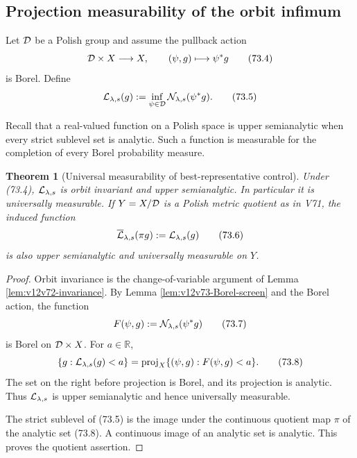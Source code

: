 \documentclass[11pt]{article}
\newtheorem{theorem}{Theorem}[section]
\theoremstyle{remark}
\begin{document}
\subsection{Projection measurability of the orbit infimum}

Let \({\cal D}\) be a Polish group and assume the pullback action
\[
                         {\cal D}\times X\longrightarrow X,
 \qquad(\psi,g)\longmapsto\psi^*g                            \tag{73.4}
\]
is Borel.  Define
\begin{equation}
 {\cal L}_{\lambda,s}(g)
 :=\inf_{\psi\in{\cal D}}
 {\cal N}_{\lambda,s}(\psi^*g).                              \tag{73.5}
\end{equation}

Recall that a real-valued function on a Polish space is upper
semianalytic when every strict sublevel set is analytic.  Such a
function is measurable for the completion of every Borel
probability measure.

\begin{theorem}[Universal measurability of best-representative
control]
\label{thm:v12v73-universal}
Under (73.4), \({\cal L}_{\lambda,s}\) is orbit invariant and upper
semianalytic.  In particular it is universally measurable.  If
\(Y=X/{\cal D}\) is a Polish metric quotient as in V71, the induced
function
\[
 \overline{\cal L}_{\lambda,s}(\pi g)
 :={\cal L}_{\lambda,s}(g)                                  \tag{73.6}
\]
is also upper semianalytic and universally measurable on \(Y\).
\end{theorem}

\begin{proof}
Orbit invariance is the change-of-variable argument of Lemma
\ref{lem:v12v72-invariance}.  By Lemma
\ref{lem:v12v73-Borel-screen} and the Borel action, the function
\[
 F(\psi,g):={\cal N}_{\lambda,s}(\psi^*g)                    \tag{73.7}
\]
is Borel on \({\cal D}\times X\).  For \(a\in\mathbb R\),
\begin{equation}
 \{g:{\cal L}_{\lambda,s}(g)<a\}
 =
 \operatorname{proj}_X\{(\psi,g):F(\psi,g)<a\}.              \tag{73.8}
\end{equation}
The set on the right before projection is Borel, and its projection
is analytic.  Thus \({\cal L}_{\lambda,s}\) is upper semianalytic
and hence universally measurable.

The strict sublevel of (73.5) is the image under the continuous
quotient map \(\pi\) of the analytic set (73.8).  A continuous image
of an analytic set is analytic.  This proves the quotient assertion.
\end{proof}
\end{document}
